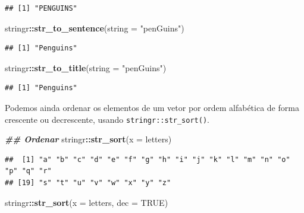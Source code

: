 \documentclass[
]{article}
\newenvironment{Shaded}{\begin{snugshade}}{\end{snugshade}}
\newcommand{\AttributeTok}[1]{\textcolor[rgb]{0.13,0.29,0.53}{#1}}
\newcommand{\ConstantTok}[1]{\textcolor[rgb]{0.56,0.35,0.01}{#1}}
\newcommand{\DocumentationTok}[1]{\textcolor[rgb]{0.56,0.35,0.01}{\textbf{\textit{#1}}}}
\newcommand{\FunctionTok}[1]{\textcolor[rgb]{0.13,0.29,0.53}{\textbf{#1}}}
\newcommand{\NormalTok}[1]{#1}
\newcommand{\SpecialCharTok}[1]{\textcolor[rgb]{0.81,0.36,0.00}{\textbf{#1}}}
\newcommand{\StringTok}[1]{\textcolor[rgb]{0.31,0.60,0.02}{#1}}
\begin{document}
\begin{verbatim}
## [1] "PENGUINS"
\end{verbatim}

\begin{Shaded}
\begin{Highlighting}[]
\NormalTok{stringr}\SpecialCharTok{::}\FunctionTok{str\_to\_sentence}\NormalTok{(}\AttributeTok{string =} \StringTok{"penGuins"}\NormalTok{)}
\end{Highlighting}
\end{Shaded}

\begin{verbatim}
## [1] "Penguins"
\end{verbatim}

\begin{Shaded}
\begin{Highlighting}[]
\NormalTok{stringr}\SpecialCharTok{::}\FunctionTok{str\_to\_title}\NormalTok{(}\AttributeTok{string =} \StringTok{"penGuins"}\NormalTok{)}
\end{Highlighting}
\end{Shaded}

\begin{verbatim}
## [1] "Penguins"
\end{verbatim}

Podemos ainda ordenar os elementos de um vetor por ordem alfabética de forma crescente ou decrescente, usando \texttt{stringr::str\_sort()}.

\begin{Shaded}
\begin{Highlighting}[]
\DocumentationTok{\#\# Ordenar}
\NormalTok{stringr}\SpecialCharTok{::}\FunctionTok{str\_sort}\NormalTok{(}\AttributeTok{x =}\NormalTok{ letters)}
\end{Highlighting}
\end{Shaded}

\begin{verbatim}
##  [1] "a" "b" "c" "d" "e" "f" "g" "h" "i" "j" "k" "l" "m" "n" "o" "p" "q" "r"
## [19] "s" "t" "u" "v" "w" "x" "y" "z"
\end{verbatim}

\begin{Shaded}
\begin{Highlighting}[]
\NormalTok{stringr}\SpecialCharTok{::}\FunctionTok{str\_sort}\NormalTok{(}\AttributeTok{x =}\NormalTok{ letters, }\AttributeTok{dec =} \ConstantTok{TRUE}\NormalTok{)}
\end{Highlighting}
\end{Shaded}
\end{document}
